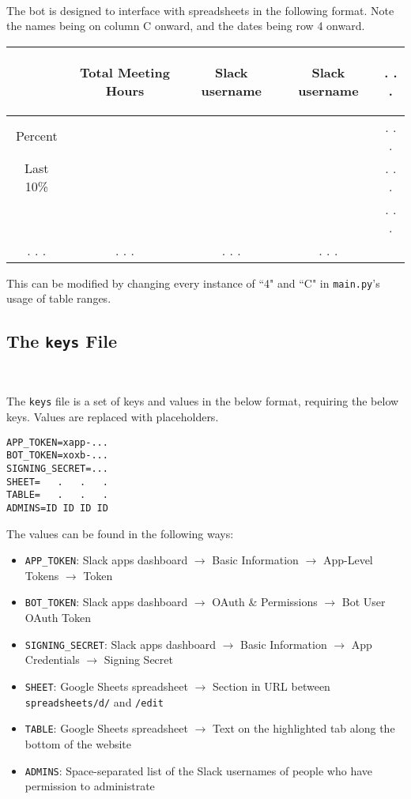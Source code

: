 \documentclass{article}
\begin{document}
\

The bot is designed to interface with spreadsheets in the following format. Note the names being on column C onward, and the dates being row 4 onward.

\begin{center} \begin{tabular}{|c||c|c|c|c} \hline
	& \begin{turn}{90}Total Meeting Hours\end{turn} & \begin{turn}{90}Slack username\end{turn} & \begin{turn}{90}Slack username\end{turn} & . . . \\ \hline
	Percent & & & & . . .\\ \hline
	Last 10\% & & & & . . .\\ \hline \hline
	& & & & . . .\\ \hline
	. . .&. . .&. . .&. . .&
\end{tabular} \end{center}

This can be modified by changing every instance of ``4" and ``C" in \texttt{main.py}'s usage of table ranges.

\subsection{The \texttt{keys} File}

\

The \texttt{keys} file is a set of keys and values in the below format, requiring the below keys. Values are replaced with placeholders.
\begin{verbatim}
APP_TOKEN=xapp-...
BOT_TOKEN=xoxb-...
SIGNING_SECRET=...
SHEET=   .   .   .
TABLE=   .   .   .
ADMINS=ID ID ID ID
\end{verbatim}

The values can be found in the following ways:
\begin{itemize}
	\item \texttt{APP\_TOKEN}: Slack apps dashboard $\to$ Basic Information $\to$ App-Level Tokens $\to$ Token
	\item \texttt{BOT\_TOKEN}: Slack apps dashboard $\to$ OAuth \& Permissions $\to$ Bot User OAuth Token
	\item \texttt{SIGNING\_SECRET}: Slack apps dashboard $\to$ Basic Information $\to$ App Credentials $\to$ Signing Secret
	\item \texttt{SHEET}: Google Sheets spreadsheet $\to$ Section in URL between \texttt{spreadsheets/d/} and \texttt{/edit}
	\item \texttt{TABLE}: Google Sheets spreadsheet $\to$ Text on the highlighted tab along the bottom of the website
	\item \texttt{ADMINS}: Space-separated list of the Slack usernames of people who have permission to administrate
\end{itemize}
\end{document}
